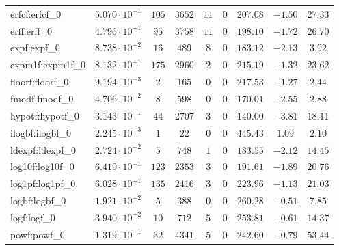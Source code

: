 \begin{tabular}{|l|c|c|c|c|c|c|c|c|}
erfcf:erfcf\_0               & $ 5.070 \cdot 10^{-1} $ & $ 105    $ & $ 3652  $ & $ 11  $ & $ 0   $ & $ 207.08      $ & $ -1.50   $ & $ 27.33   $ \\
erff:erff\_0                 & $ 4.796 \cdot 10^{-1} $ & $ 95     $ & $ 3758  $ & $ 11  $ & $ 0   $ & $ 198.10      $ & $ -1.72   $ & $ 26.70   $ \\
expf:expf\_0                 & $ 8.738 \cdot 10^{-2} $ & $ 16     $ & $ 489   $ & $ 8   $ & $ 0   $ & $ 183.12      $ & $ -2.13   $ & $ 3.92    $ \\
expm1f:expm1f\_0             & $ 8.132 \cdot 10^{-1} $ & $ 175    $ & $ 2960  $ & $ 2   $ & $ 0   $ & $ 215.19      $ & $ -1.32   $ & $ 23.62   $ \\
floorf:floorf\_0             & $ 9.194 \cdot 10^{-3} $ & $ 2      $ & $ 165   $ & $ 0   $ & $ 0   $ & $ 217.53      $ & $ -1.27   $ & $ 2.44    $ \\
fmodf:fmodf\_0               & $ 4.706 \cdot 10^{-2} $ & $ 8      $ & $ 598   $ & $ 0   $ & $ 0   $ & $ 170.01      $ & $ -2.55   $ & $ 2.88    $ \\
hypotf:hypotf\_0             & $ 3.143 \cdot 10^{-1} $ & $ 44     $ & $ 2707  $ & $ 3   $ & $ 0   $ & $ 140.00      $ & $ -3.81   $ & $ 18.11   $ \\
ilogbf:ilogbf\_0             & $ 2.245 \cdot 10^{-3} $ & $ 1      $ & $ 22    $ & $ 0   $ & $ 0   $ & $ 445.43      $ & $ 1.09    $ & $ 2.10    $ \\
ldexpf:ldexpf\_0             & $ 2.724 \cdot 10^{-2} $ & $ 5      $ & $ 748   $ & $ 1   $ & $ 0   $ & $ 183.55      $ & $ -2.12   $ & $ 14.45   $ \\
log10f:log10f\_0             & $ 6.419 \cdot 10^{-1} $ & $ 123    $ & $ 2353  $ & $ 3   $ & $ 0   $ & $ 191.61      $ & $ -1.89   $ & $ 20.76   $ \\
log1pf:log1pf\_0             & $ 6.028 \cdot 10^{-1} $ & $ 135    $ & $ 2416  $ & $ 3   $ & $ 0   $ & $ 223.96      $ & $ -1.13   $ & $ 21.03   $ \\
logbf:logbf\_0               & $ 1.921 \cdot 10^{-2} $ & $ 5      $ & $ 388   $ & $ 0   $ & $ 0   $ & $ 260.28      $ & $ -0.51   $ & $ 7.85    $ \\
logf:logf\_0                 & $ 3.940 \cdot 10^{-2} $ & $ 10     $ & $ 712   $ & $ 5   $ & $ 0   $ & $ 253.81      $ & $ -0.61   $ & $ 14.37   $ \\
powf:powf\_0                 & $ 1.319 \cdot 10^{-1} $ & $ 32     $ & $ 4341  $ & $ 5   $ & $ 0   $ & $ 242.60      $ & $ -0.79   $ & $ 53.44   $ \\

\end{tabular}
